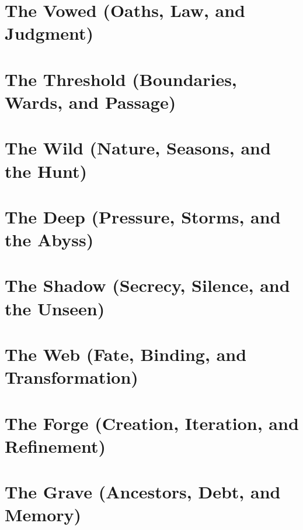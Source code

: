 \documentclass[11pt,letterpaper]{book}
\newcommand{\cfile}[1]{}
\begin{document}
\chapter{The Vowed (Oaths, Law, and Judgment)}
\cfile{patrons/vowed/01_oath_of_flame_and_light}
\cfile{patrons/vowed/02_oath_of_mercy_and_grace}
\cfile{patrons/vowed/03_mykkiel}
\cfile{patrons/vowed/04_inquisitor_prime}
\cfile{patrons/vowed/05_the_witness}

\chapter{The Threshold (Boundaries, Wards, and Passage)}
\cfile{patrons/threshold/01_the_sealed_gate}
\cfile{patrons/threshold/02_the_traveler}
\cfile{patrons/threshold/03_the_pale_shepherd}

\chapter{The Wild (Nature, Seasons, and the Hunt)}
\cfile{patrons/wild/01_grimmir}
\cfile{patrons/wild/02_the_carrion_king}
\cfile{patrons/wild/03_the_savage_heart}

\chapter{The Deep (Pressure, Storms, and the Abyss)}
\cfile{patrons/deep/01_khemesh}
\cfile{patrons/deep/02_xhakthul}
\cfile{patrons/deep/03_raeyn}

\chapter{The Shadow (Secrecy, Silence, and the Unseen)}
\cfile{patrons/shadow/01_ikasha}
\cfile{patrons/shadow/02_the_silent_choir}
\cfile{patrons/shadow/03_aveh}

\chapter{The Web (Fate, Binding, and Transformation)}
\cfile{patrons/web/01_inaea}
\cfile{patrons/web/02_isoka}
\cfile{patrons/web/03_malachai}

\chapter{The Forge (Creation, Iteration, and Refinement)}
\cfile{patrons/forge/01_clockwork_monad}

\chapter{The Grave (Ancestors, Debt, and Memory)}
\cfile{patrons/grave/01_varnek_karn}
\cfile{patrons/grave/02_the_high_mother}
\end{document}

